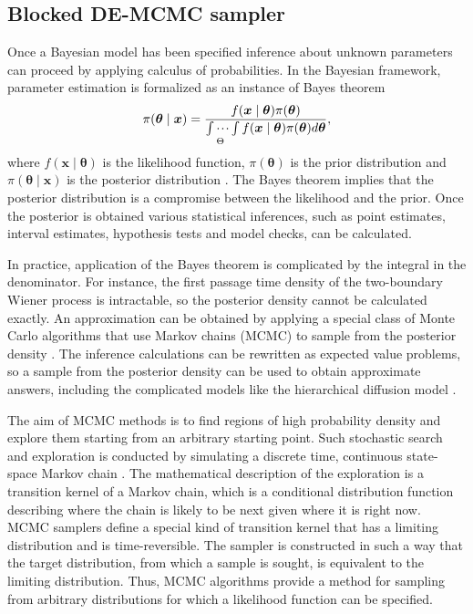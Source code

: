 \documentclass[12pt]{article}
\begin{document}
\subsection{Blocked DE-MCMC sampler}
	Once a Bayesian model has been specified inference about unknown parameters can proceed by applying calculus of probabilities. In the Bayesian framework, parameter estimation is formalized as an instance of Bayes theorem 
\begin{equation}
\pi(\boldsymbol{\theta} \mid \boldsymbol{x}) = 
\frac{f(\boldsymbol{x} \mid \boldsymbol{\theta}) \pi(\boldsymbol{\theta})}
{\idotsint\limits_\Theta f(\boldsymbol{x} \mid \boldsymbol{\theta}) \pi(\boldsymbol{\theta})d\boldsymbol{\theta}},
\end{equation}
where $f(\boldsymbol{x} \mid \boldsymbol{\theta})$ is the likelihood function, $\pi(\boldsymbol{\theta})$ is the prior distribution and $\pi(\boldsymbol{\theta} \mid \boldsymbol{x})$ is the posterior distribution \citep{Ber1997,CasBer2002,GelCar2013}. The Bayes theorem implies that the posterior distribution is a compromise between the likelihood and the prior. Once the posterior is obtained various statistical inferences, such as point estimates, interval estimates, hypothesis tests and model checks, can be calculated.

	In practice, application of the Bayes theorem is complicated by the integral in the denominator. For instance, the first passage time density of the two-boundary Wiener process is intractable, so the posterior density cannot be calculated exactly. An approximation can be obtained by applying a special class of Monte Carlo algorithms that use Markov chains (MCMC) to sample from the posterior density \citep{RobCas2004,GamLop2006,GivHoe2012,GelCar2013}. The inference calculations can be rewritten as expected value problems, so a sample from the posterior density can be used to obtain approximate answers, including the complicated models like the hierarchical diffusion model \citep{PerVan2002,CraPer2010,VanTue2011}. 
    
	The aim of MCMC methods is to find regions of high probability density and explore them starting from an arbitrary starting point. Such stochastic search and exploration is conducted by simulating a discrete time, continuous state-space Markov chain \citep{KarTay1975,KarTay1981,Ros2014}. The mathematical description of the exploration is a transition kernel of a Markov chain, which is a conditional distribution function describing where the chain is likely to be next given where it is right now. MCMC samplers define a special kind of transition kernel that has a limiting distribution and is time-reversible. The sampler is constructed in such a way that the target distribution, from which a sample is sought, is equivalent to the limiting distribution. Thus, MCMC algorithms provide a method for sampling from arbitrary distributions for which a likelihood function can be specified. 
    
\end{document}

